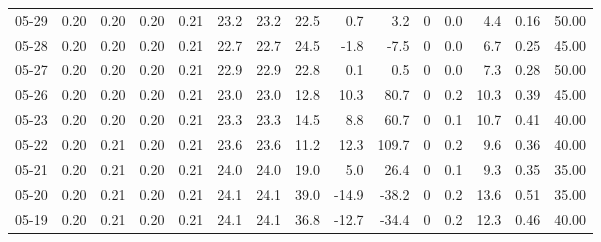 \begin{threeparttable}
{\begin{tabular}{lrrrrrrrrrrrrrr}
  05-29 &          0.20 &          0.20 &          0.20 &        0.21 &                23.2 &               23.2 &                22.5 &        0.7 &          3.2 &              0 &                 0.0 &              4.4 &            0.16 &                  50.00 \\
  05-28 &          0.20 &          0.20 &          0.20 &        0.21 &                22.7 &               22.7 &                24.5 &       -1.8 &         -7.5 &              0 &                 0.0 &              6.7 &            0.25 &                  45.00 \\
  05-27 &          0.20 &          0.20 &          0.20 &        0.21 &                22.9 &               22.9 &                22.8 &        0.1 &          0.5 &              0 &                 0.0 &              7.3 &            0.28 &                  50.00 \\
  05-26 &          0.20 &          0.20 &          0.20 &        0.21 &                23.0 &               23.0 &                12.8 &       10.3 &         80.7 &              0 &                 0.2 &             10.3 &            0.39 &                  45.00 \\
  05-23 &          0.20 &          0.20 &          0.20 &        0.21 &                23.3 &               23.3 &                14.5 &        8.8 &         60.7 &              0 &                 0.1 &             10.7 &            0.41 &                  40.00 \\
  05-22 &          0.20 &          0.21 &          0.20 &        0.21 &                23.6 &               23.6 &                11.2 &       12.3 &        109.7 &              0 &                 0.2 &              9.6 &            0.36 &                  40.00 \\
  05-21 &          0.20 &          0.21 &          0.20 &        0.21 &                24.0 &               24.0 &                19.0 &        5.0 &         26.4 &              0 &                 0.1 &              9.3 &            0.35 &                  35.00 \\
  05-20 &          0.20 &          0.21 &          0.20 &        0.21 &                24.1 &               24.1 &                39.0 &      -14.9 &        -38.2 &              0 &                 0.2 &             13.6 &            0.51 &                  35.00 \\
  05-19 &          0.20 &          0.21 &          0.20 &        0.21 &                24.1 &               24.1 &                36.8 &      -12.7 &        -34.4 &              0 &                 0.2 &             12.3 &            0.46 &                  40.00 \\

\end{tabular}}
\end{threeparttable}
